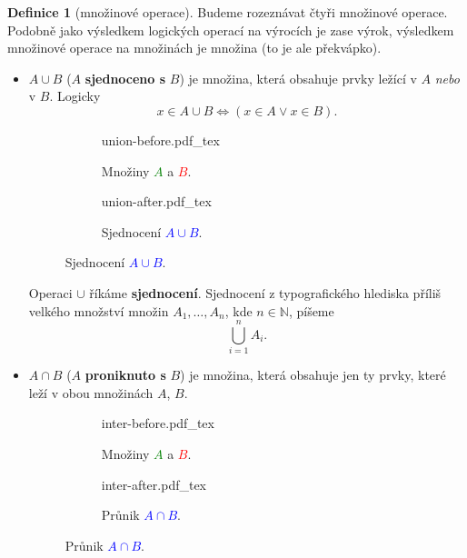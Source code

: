 \documentclass[a4paper,11pt]{article}
\theoremstyle{definition}
\newtheorem{dfn}[thm]{Definice}
\theoremstyle{plain}
\newcommand{\N}{\mathbb{N}}
\begin{document}
\begin{dfn}[množinové operace]
 Budeme rozeznávat čtyři množinové operace. Podobně jako výsledkem logických
 operací na výrocích je zase výrok, výsledkem množinové operace na množinách je
 množina (to je ale překvápko).
 \begin{itemize}
  \item $A \cup B$ ($A$ \textbf{sjednoceno s} $B$) je množina, která obsahuje
   prvky ležící v $A$ \emph{nebo} v $B$. Logicky
   \[
    x \in A \cup B \Leftrightarrow (x \in A \vee x \in B).
   \]
   \begin{center}
    \begin{figure}[h]
     \centering
     \begin{subfigure}{0.45\textwidth}
      \centering
      \def\svgwidth{0.6\textwidth}
      {union-before.pdf_tex}
      \caption*{Množiny \textcolor{green}{$A$} a \textcolor{red}{$B$}.}
     \end{subfigure}
     \begin{subfigure}{0.45\textwidth}
      \centering
      \def\svgwidth{0.6\textwidth}
      {union-after.pdf_tex}
      \caption*{Sjednocení \textcolor{blue}{$A \cup B$}.}
     \end{subfigure}
    \end{figure}
   \end{center}
   \vspace*{-8mm}
   Operaci $ \cup $ říkáme \textbf{sjednocení}. Sjednocení z typografického
   hlediska příliš velkého množství množin $A_1,\ldots,A_n$, kde $n \in \N$,
   píšeme
   \[
    \bigcup_{i=1}^{n} A_i.
   \]
  \item $A \cap B$ ($A$ \textbf{proniknuto s} $B$) je množina, která obsahuje
   jen ty prvky, které leží v obou množinách $A$, $B$.
   \newpage
   \begin{center}
    \begin{figure}[h]
     \centering
     \begin{subfigure}{0.45\textwidth}
      \centering
      \def\svgwidth{0.6\textwidth}
      {inter-before.pdf_tex}
      \caption*{Množiny \textcolor{green}{$A$} a \textcolor{red}{$B$}.}
     \end{subfigure}
     \begin{subfigure}{0.45\textwidth}
      \centering
      \def\svgwidth{0.6\textwidth}
      {inter-after.pdf_tex}
      \caption*{Průnik \textcolor{blue}{$A \cap B$}.}
     \end{subfigure}
    \end{figure}

\end{center}
\end{itemize}
\end{dfn}
\end{document}
